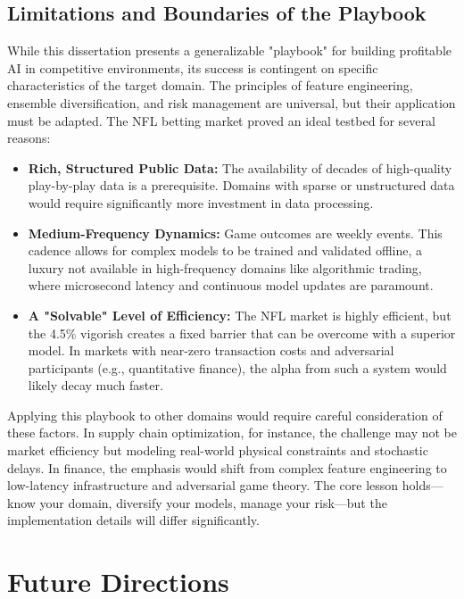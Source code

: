 \subsection*{Limitations and Boundaries of the Playbook}

While this dissertation presents a generalizable "playbook" for building profitable AI in competitive environments, its success is contingent on specific characteristics of the target domain. The principles of feature engineering, ensemble diversification, and risk management are universal, but their application must be adapted. The NFL betting market proved an ideal testbed for several reasons:

\begin{itemize}
    \item \textbf{Rich, Structured Public Data:} The availability of decades of high-quality play-by-play data is a prerequisite. Domains with sparse or unstructured data would require significantly more investment in data processing.
    \item \textbf{Medium-Frequency Dynamics:} Game outcomes are weekly events. This cadence allows for complex models to be trained and validated offline, a luxury not available in high-frequency domains like algorithmic trading, where microsecond latency and continuous model updates are paramount.
    \item \textbf{A "Solvable" Level of Efficiency:} The NFL market is highly efficient, but the 4.5\% vigorish creates a fixed barrier that can be overcome with a superior model. In markets with near-zero transaction costs and adversarial participants (e.g., quantitative finance), the alpha from such a system would likely decay much faster.
\end{itemize}

Applying this playbook to other domains would require careful consideration of these factors. In supply chain optimization, for instance, the challenge may not be market efficiency but modeling real-world physical constraints and stochastic delays. In finance, the emphasis would shift from complex feature engineering to low-latency infrastructure and adversarial game theory. The core lesson holds—know your domain, diversify your models, manage your risk—but the implementation details will differ significantly.

\section{Future Directions}

